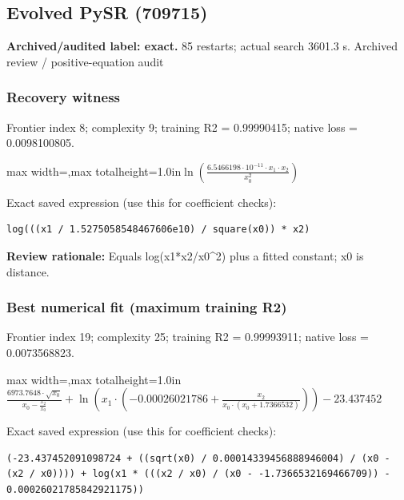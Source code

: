 \documentclass[10pt,letterpaper,landscape]{article}
\begin{document}
\begin{minipage}[t]{0.485\textwidth}
\subsection*{Evolved PySR (709715)}
\textbf{Archived/audited label: exact.} 85 restarts; actual search 3601.3 s.
{\small Archived review / positive-equation audit}
\subsubsection*{Recovery witness}
Frontier index 8; complexity 9; training R2 = 0.99990415; native loss = 0.0098100805.
\begin{center}\begin{adjustbox}{max width=\linewidth,max totalheight=1.0in}$\displaystyle \ln{\left(\frac{6.5466198 \cdot 10^{-11} \cdot x_{1} \cdot x_{2}}{x_{0}^{2}} \right)}$\end{adjustbox}\end{center}
{\scriptsize Exact saved expression (use this for coefficient checks):}
\begin{lstlisting}
log(((x1 / 1.5275058548467606e10) / square(x0)) * x2)
\end{lstlisting}
{\small\textbf{Review rationale:} Equals log(x1*x2/x0\textasciicircum{}2) plus a fitted constant; x0 is distance.}
\subsubsection*{Best numerical fit (maximum training R2)}
Frontier index 19; complexity 25; training R2 = 0.99993911; native loss = 0.0073568823.
\begin{center}\begin{adjustbox}{max width=\linewidth,max totalheight=1.0in}$\displaystyle \frac{6973.7648 \cdot \sqrt{x_{0}}}{x_{0} - \frac{x_{2}}{x_{0}}} + \ln{\left(x_{1} \cdot \left(-0.00026021786 + \frac{x_{2}}{x_{0} \cdot \left(x_{0} + 1.7366532\right)}\right) \right)} - 23.437452$\end{adjustbox}\end{center}
{\scriptsize Exact saved expression (use this for coefficient checks):}
\begin{lstlisting}
(-23.437452091098724 + ((sqrt(x0) / 0.00014339456888946004) / (x0 - (x2 / x0)))) + log(x1 * (((x2 / x0) / (x0 - -1.7366532169466709)) - 0.00026021785842921175))
\end{lstlisting}
\end{minipage}
\clearpage{}\label{newton-10007}
\end{document}
